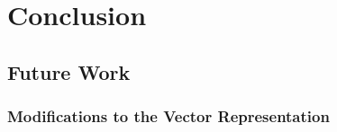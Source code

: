 \documentclass[thesis.tex]{subfiles}
\begin{document}
\chapter{Conclusion}


\section{Future Work}

\subsection{Modifications to the Vector Representation}

\end{document}
